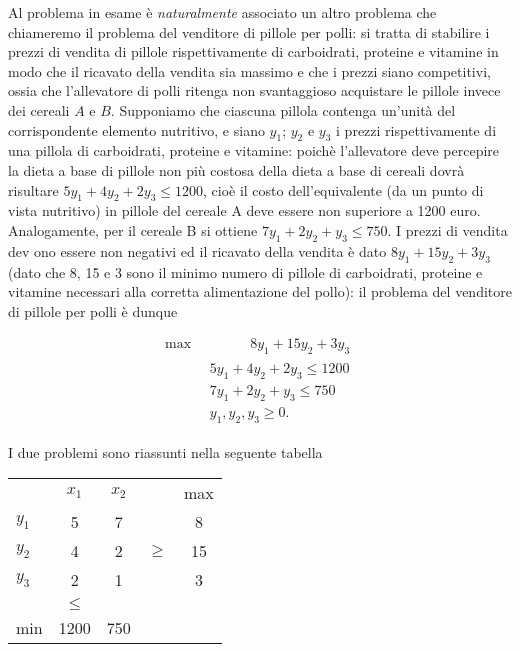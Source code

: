 \documentclass[a4paper,11pt]{article}
\begin{document}
Al
problema
in esame è \textit{naturalmente}
associato
un
altro
problema
che chiameremo
il
problema
del
venditore di pillole
per polli: si tratta
di stabilire
i prezzi
di vendita
di
pillole
rispettivamente di carboidrati,
proteine
e vitamine
in modo
che
il ricavato
della
vendita
sia
massimo
e che i prezzi
siano
competitivi,
ossia
che l'allevatore
di polli
ritenga
non
svantaggioso
acquistare
le pillole
invece
dei
cereali
$A$
e
$B.$ Supponiamo
che
ciascuna
pillola
contenga
un'unità del
corrispondente elemento nutritivo, e siano
$y_1$; $y_2$ e $y_3$
i prezzi
rispettivamente di una
pillola
di carboidrati,
proteine
e vitamine:
poichè l'allevatore
deve
percepire
la dieta
a base
di pillole
non
più costosa
della
dieta
a base
di cereali
dovrà
risultare
$5y_1
+ 4y_2
+ 2y_3 \leq
1200$,
cioè  il costo
dell'equivalente (da
un
punto
di vista
nutritivo) in pillole
del
cereale
A
deve essere
non
superiore
a 1200
euro.
Analogamente,
per
il cereale
B
si ottiene
$7y_1
+ 2y_2
+
y_3
\leq
750.$
I prezzi
di vendita
dev
ono
essere
non
negativi
ed
il ricavato
della
vendita
è dato
$8y_1 + 15y_2 + 3y_3$
(dato
che
8, 15
e 3 sono
il minimo
numero
di pillole
di carboidrati,
proteine
e vitamine
necessari
alla
corretta alimentazione
del
pollo):
il problema
del
venditore
di pillole
per polli è dunque

\begin{equation}\begin{split}
\text{max}\qquad\qquad\ 8y_1+15y_2+3y_3\\
\text{} \qquad
\begin{split} 
&5y_1+4y_2+2y_3\leq 1200\\
&7y_1+2y_2+y_3\leq 750\\
&y_1,y_2,y_3\geq0.
\end{split}
\end{split}
\end{equation}

I due problemi sono riassunti nella seguente tabella

\begin{center}
	
\begin{tabular}{l*{4}{c}}
	
	& $x_1$ & $x_2$ & & max \\
	$y_1$ & 5 & 7 & & 8  \\
	$y_2$ & 4 & 2 & $\geq$ & 15 \\
	$y_3$ & 2 & 1 & & 3 \\
	& $\leq$ \\
	min & 1200 & 750 &&
	
\end{tabular}
\end{center}
\end{document}
